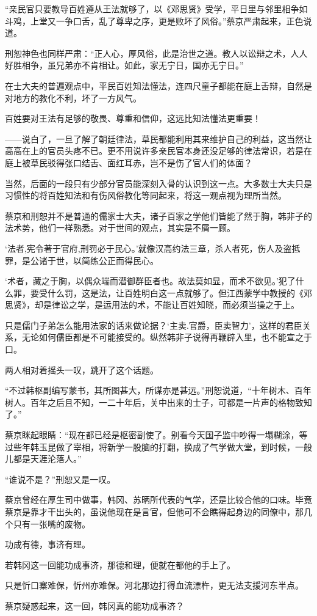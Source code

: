 “亲民官只要教导百姓遵从王法就够了，以《邓思贤》受学，平日里与邻里相争如斗鸡，上堂又一争口舌，乱了尊卑之序，更是败坏了风俗。”蔡京严肃起来，正色说道。

刑恕神色也同样严肃：“正人心，厚风俗，此是治世之道。教人以讼辩之术，人人好胜相争，虽兄弟亦不肯相让。如此，家无宁日，国亦无宁日。”

在士大夫的普遍观点中，平民百姓知法懂法，连四尺童子都能在庭上舌辩，自然是对地方的教化不利，坏了一方风气。

百姓要对王法有足够的敬畏、尊重和信仰，这远比知法懂法更重要！

——说白了，一旦了解了朝廷律法，草民都能利用其来维护自己的利益，这当然让高高在上的官员头疼不已。更不用说许多亲民官本身还没足够的律法常识，若是在庭上被草民驳得张口结舌、面红耳赤，岂不是伤了官人们的体面？

当然，后面的一段只有少部分官员能深刻入骨的认识到这一点。大多数士大夫只是习惯性的将百姓知法和有伤风俗教化等同起来，将这一观点视为理所当然。

蔡京和刑恕并不是普通的儒家士大夫，诸子百家之学他们皆能了然于胸，韩非子的法术势，他们一样熟悉。对于世间的观点，其实是不屑一顾。

‘法者,宪令著于官府,刑罚必于民心。’就像汉高约法三章，杀人者死，伤人及盗抵罪，是公诸于世，以简练公正而得民心。

‘术者，藏之于胸，以偶众端而潜御群臣者也。故法莫如显，而术不欲见。’犯了什么罪，要受什么罚，这是法，让百姓明白这一点就够了。但江西蒙学中教授的《邓思贤》，却是律讼之学，是运用法的术，不能让百姓知晓，而必须当操之于上。

只是儒门子弟怎么能用法家的话来做论据？‘主卖.官爵，臣卖智力’，这样的君臣关系，无论如何儒臣都是不可能接受的。纵然韩非子说得再鞭辟入里，也不能宣之于口。

两人相对着摇头一叹，跳开了这个话题。

“不过韩枢副编写蒙书，其所图甚大，所谋亦是甚远。”刑恕说道，“十年树木、百年树人。百年之后且不知，一二十年后，关中出来的士子，可都是一片声的格物致知了。”

蔡京眯起眼睛：“现在都已经是枢密副使了。别看今天国子监中吵得一塌糊涂，等过些年韩玉昆做了宰相，将新学一股脑的打翻，换成了气学做大堂，到时候，一般儿都是天涯沦落人。”

“谁说不是？”刑恕又是一叹。

蔡京曾经在厚生司中做事，韩冈、苏昞所代表的气学，还是比较合他的口味。毕竟蔡京是靠才干出头的，虽说他现在是言官，但他可不会瞧得起身边的同僚中，那几个只有一张嘴的废物。

功成有德，事济有理。

若韩冈这一回能功成事济，那德和理，便就在都他的手上了。

只是忻口寨难保，忻州亦难保。河北那边打得血流漂杵，更无法支援河东半点。

蔡京疑惑起来，这一回，韩冈真的能功成事济？
